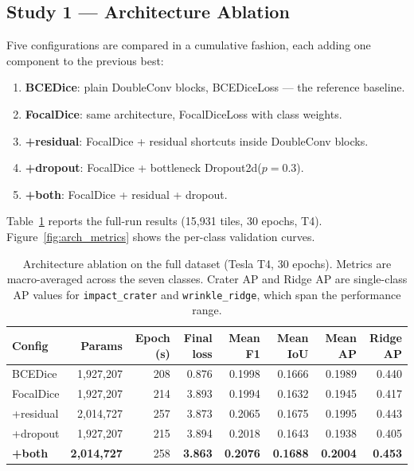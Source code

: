 \subsection{Study 1 — Architecture Ablation}
\label{sec:mr_arch_ablation}

Five configurations are compared in a cumulative fashion, each adding one component to the previous best:

\begin{enumerate}
    \item \textbf{BCEDice}: plain DoubleConv blocks, BCEDiceLoss — the reference baseline.
    \item \textbf{FocalDice}: same architecture, FocalDiceLoss with class weights.
    \item \textbf{+residual}: FocalDice + residual shortcuts inside DoubleConv blocks.
    \item \textbf{+dropout}: FocalDice + bottleneck Dropout2d($p=0.3$).
    \item \textbf{+both}: FocalDice + residual + dropout.
\end{enumerate}

Table~\ref{tab:arch_comparison} reports the full-run results (15{,}931 tiles, 30 epochs, T4).
Figure~\ref{fig:arch_metrics} shows the per-class validation curves.

\begin{table}[h]
\centering
\caption{Architecture ablation on the full dataset (Tesla T4, 30 epochs). Metrics are macro-averaged across the seven classes. Crater AP and Ridge AP are single-class AP values for \texttt{impact\_crater} and \texttt{wrinkle\_ridge}, which span the performance range.}
\label{tab:arch_comparison}
\begin{tabular}{lrrrrrrr}
\toprule
Config & Params & Epoch (s) & Final loss & Mean F1 & Mean IoU & Mean AP & Ridge AP \\
\midrule
BCEDice    & 1{,}927{,}207 & 208 & 0.876 & 0.1998 & 0.1666 & 0.1989 & 0.440 \\
FocalDice  & 1{,}927{,}207 & 214 & 3.893 & 0.1994 & 0.1632 & 0.1945 & 0.417 \\
+residual  & 2{,}014{,}727 & 257 & 3.873 & 0.2065 & 0.1675 & 0.1995 & 0.443 \\
+dropout   & 1{,}927{,}207 & 215 & 3.894 & 0.2018 & 0.1643 & 0.1938 & 0.405 \\
\textbf{+both} & \textbf{2{,}014{,}727} & 258 & \textbf{3.863} & \textbf{0.2076} & \textbf{0.1688} & \textbf{0.2004} & \textbf{0.453} \\
\bottomrule
\end{tabular}
\end{table}

